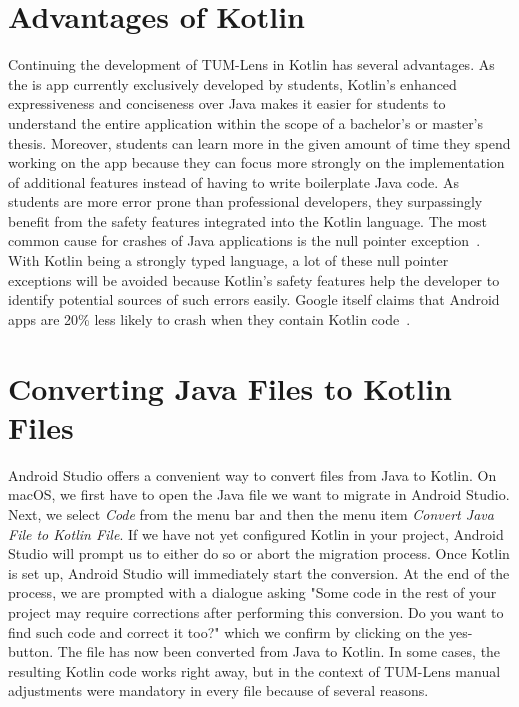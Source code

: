\documentclass[
			   fontsize=11pt,
               paper=a4,
               bibliography=totoc,
               idxtotoc,
               headsepline,
               footsepline,
               footinclude=false,
               BCOR=12mm,
               DIV=13,
               openany,   %
               oneside    %
               ]
               {scrbook}
\begin{document}
\section{Advantages of Kotlin}
Continuing the development of TUM-Lens in Kotlin has several advantages. As the is app currently exclusively developed by students, Kotlin's enhanced expressiveness and conciseness over Java makes it easier for students to understand the entire application within the scope of a bachelor's or master's thesis. Moreover, students can learn more in the given amount of time they spend working on the app because they can focus more strongly on the implementation of additional features instead of having to write boilerplate Java code. As students are more error prone than professional developers, they surpassingly benefit from the safety features integrated into the Kotlin language. The most common cause for crashes of Java applications is the null pointer exception~\cite{nullPointerSamebug, nullPointerOverops}. With Kotlin being a strongly typed language, a lot of these null pointer exceptions will be avoided because Kotlin's safety features help the developer to identify potential sources of such errors easily. Google itself claims that Android apps are 20\% less likely to crash when they contain Kotlin code~\cite{kotlinFirst}.

\section{Converting Java Files to Kotlin Files}

Android Studio offers a convenient way to convert files from Java to Kotlin. On macOS, we first have to open the Java file we want to migrate in Android Studio. Next, we select \textit{Code} from the menu bar and then the menu item \textit{Convert Java File to Kotlin File}. If we have not yet configured Kotlin in your project, Android Studio will prompt us to either do so or abort the migration process. Once Kotlin is set up, Android Studio will immediately start the conversion. At the end of the process, we are prompted with a dialogue asking "Some code in the rest of your project may require corrections after performing this conversion. Do you want to find such code and correct it too?" which we confirm by clicking on the yes-button. The file has now been converted from Java to Kotlin. In some cases, the resulting Kotlin code works right away, but in the context of TUM-Lens manual adjustments were mandatory in every file because of several reasons. \\
\end{document}
